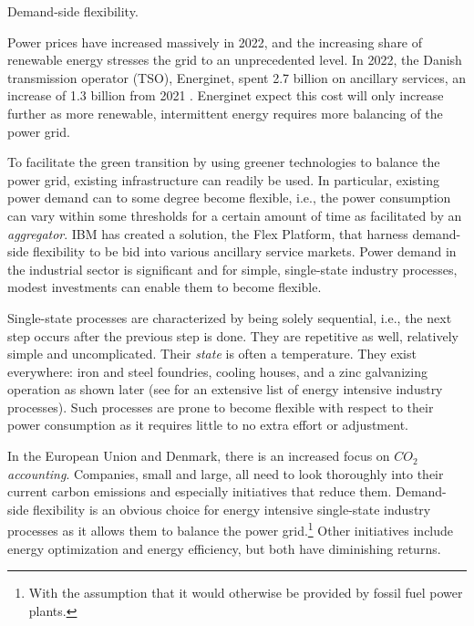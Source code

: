 \documentclass[lettersize,journal]{IEEEtran}
\begin{document}
\begin{IEEEkeywords}
    Demand-side flexibility.
\end{IEEEkeywords}



Power prices have increased massively in 2022, and the increasing share of renewable energy stresses the grid to an unprecedented level. In 2022, the Danish transmission operator (TSO), Energinet, spent 2.7 billion on ancillary services, an increase of 1.3 billion from 2021 \cite{energinetOmkostninger}. Energinet expect this cost will only increase further as more renewable, intermittent energy requires more balancing of the power grid.

To facilitate the green transition by using greener technologies to balance the power grid, existing infrastructure can readily be used. In particular, existing power demand can to some degree become flexible, i.e., the power consumption can vary within some thresholds for a certain amount of time as facilitated by an \textit{aggregator}. IBM has created a solution, the Flex Platform, that harness demand-side flexibility to be bid into various ancillary service markets. Power demand in the industrial sector is significant and for simple, single-state industry processes, modest investments can enable them to become flexible.

Single-state processes are characterized by being solely sequential, i.e., the next step occurs after the previous step is done. They are repetitive as well, relatively simple and uncomplicated. Their \textit{state} is often a temperature. They exist everywhere: iron and steel foundries, cooling houses, and a zinc galvanizing operation as shown later (see \cite{paulus2011potential} for an extensive list of energy intensive industry processes). Such processes are prone to become flexible with respect to their power consumption as it requires little to no extra effort or adjustment.

In the European Union and Denmark, there is an increased focus on $CO_{2}$ \textit{accounting}. Companies, small and large, all need to look thoroughly into their current carbon emissions and especially initiatives that reduce them. Demand-side flexibility is an obvious choice for energy intensive single-state industry processes as it allows them to balance the power grid.\footnote{With the assumption that it would otherwise be provided by fossil fuel power plants.} Other initiatives include energy optimization and energy efficiency, but both have diminishing returns.
\end{document}
